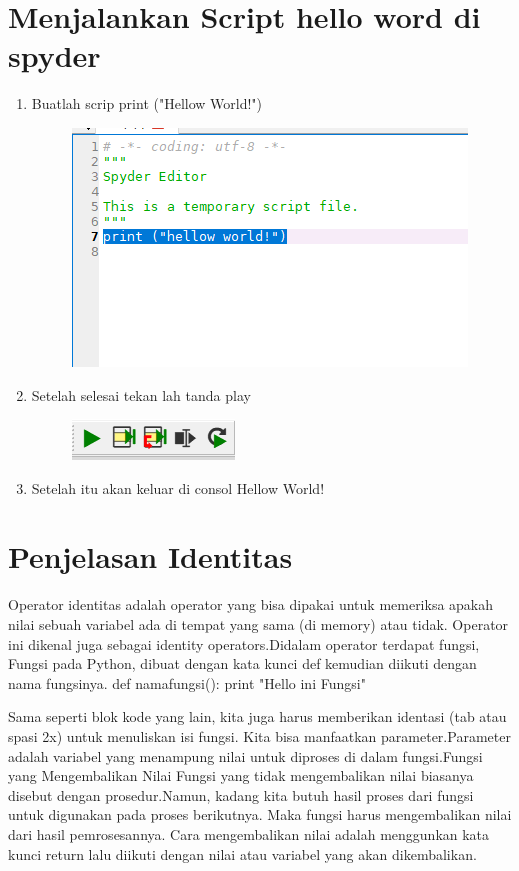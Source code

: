 \section{Menjalankan Script hello word di spyder}
\begin{enumerate}
    \item Buatlah scrip print ("Hellow World!")
\begin{figure}[!htbp]
    \centering
    \includegraphics[scale=0.7]{figures/16.png}
    \label{visimisi}
\end{figure}

    \item Setelah selesai tekan lah tanda play 
\begin{figure}[!htbp]
    \centering
    \includegraphics[scale=0.7]{figures/17.png}
    \label{visimisi}
\end{figure}
     \item Setelah itu akan keluar di consol Hellow World!
\end{enumerate}

\section{Penjelasan Identitas}
Operator identitas adalah operator yang bisa dipakai untuk memeriksa apakah nilai sebuah variabel ada di tempat yang sama (di memory) atau tidak. Operator ini dikenal juga sebagai identity operators.Didalam operator terdapat fungsi,
Fungsi pada Python, dibuat dengan kata kunci def kemudian diikuti dengan nama fungsinya.
    def namafungsi():
    print "Hello ini Fungsi"
    
    Sama seperti blok kode yang lain, kita juga harus memberikan identasi (tab atau spasi 2x) untuk menuliskan isi fungsi.
Kita bisa manfaatkan parameter.Parameter adalah variabel yang menampung nilai untuk diproses di dalam fungsi.Fungsi yang Mengembalikan Nilai
Fungsi yang tidak mengembalikan nilai biasanya disebut dengan prosedur.Namun, kadang kita butuh hasil proses dari fungsi untuk digunakan pada proses berikutnya.
Maka fungsi harus mengembalikan nilai dari hasil pemrosesannya.
Cara mengembalikan nilai adalah menggunkan kata kunci return lalu diikuti dengan nilai atau variabel yang akan dikembalikan.

